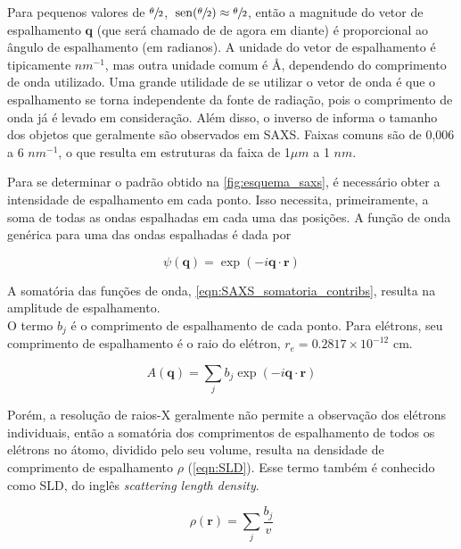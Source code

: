 		Para pequenos valores de \(\sfrac{\theta}{2}\), \(\hspace{2pt}\mathrm{sen}(\sfrac{\theta}{2}) \approx \sfrac{\theta}{2}\), então a magnitude do vetor de espalhamento \(\mathbf{q}\) (que será chamado de \q{} de agora em diante) é proporcional ao ângulo de espalhamento (em radianos).\cite{Glatter2018livro} A unidade do vetor de espalhamento é tipicamente \(nm^{-1}\), mas outra unidade comum é \AA\menosUm, dependendo do comprimento de onda utilizado. Uma grande utilidade de se utilizar o vetor de onda é que o espalhamento se torna independente da fonte de radiação, pois o comprimento de onda já é levado em consideração. Além disso, o inverso de \q{} informa o tamanho dos objetos que geralmente são observados em SAXS. Faixas comuns são de 0,006 a 6 \(nm^{-1}\), o que resulta em estruturas da faixa de 1\(\mu m\) a 1 \(nm\).\cite{Narayanan2008a}

		Para se determinar o padrão obtido na \autoref{fig:esquema_saxs}, é necessário obter a intensidade de espalhamento em cada ponto. Isso necessita, primeiramente, a soma de todas as ondas espalhadas em cada uma das posições. A função de onda genérica para uma das ondas espalhadas é dada por\cite{Pedersen_Aula1}
		
		\begin{equation}
			\psi(\mathbf{q}) = \exp(-i \mathbf{q} \cdot \mathbf{r})
			\label{eqn:funcao_onda_espalhamento}
		\end{equation}
				
		A somatória das funções de onda, \autoref{eqn:SAXS_somatoria_contribs}, resulta na amplitude de espalhamento.\\\cite{Pedersen_Aula1} O termo \(b_j\) é o comprimento de espalhamento de cada ponto. Para elétrons, seu comprimento de espalhamento é o raio do elétron, \(r_e = 0.2817 \times 10^{-12}\) cm.
		
		\begin{equation}
			A(\mathbf{q}) = \sum_j b_j \exp(-i \mathbf{q} \cdot \mathbf{r})
			\label{eqn:SAXS_somatoria_contribs}
		\end{equation}
		
		Porém, a resolução de raios-X geralmente não permite a observação dos elétrons individuais, então a somatória dos comprimentos de espalhamento de todos os elétrons no átomo, dividido pelo seu volume, resulta na densidade de comprimento de espalhamento \(\rho\) (\autoref{eqn:SLD}). Esse termo também é conhecido como SLD, do inglês \emph{scattering length density}.\cite{Pedersen_Aula1}
		
		\begin{equation}
			\rho(\mathbf{r}) = \sum_j \dfrac{b_j}{v}
			\label{eqn:SLD}
		\end{equation} 
		
